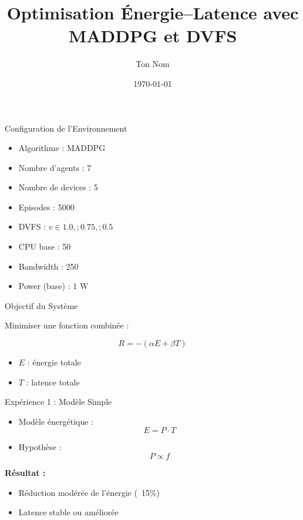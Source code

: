 \documentclass{beamer}
\title{Optimisation Énergie–Latence avec MADDPG et DVFS}
\author{Ton Nom}
\date{\today}
\begin{document}
\begin{frame}
\titlepage
\end{frame}

\begin{frame}{Configuration de l’Environnement}

\begin{itemize}
\item Algorithme : MADDPG
\item Nombre d'agents : 7
\item Nombre de devices : 5
\item Episodes : 5000
\item DVFS : $v \in {1.0,;0.75,;0.5}$
\item CPU base : 50
\item Bandwidth : 250
\item Power (base) : 1 W
\end{itemize}

\end{frame}

\begin{frame}{Objectif du Système}

Minimiser une fonction combinée :

\begin{equation}
R = -(\alpha E + \beta T)
\end{equation}

\begin{itemize}
\item $E$ : énergie totale
\item $T$ : latence totale
\end{itemize}

\end{frame}

\begin{frame}{Expérience 1 : Modèle Simple}

\begin{itemize}
\item Modèle énergétique :
\begin{equation}
E = P \cdot T
\end{equation}

\item Hypothèse :
\begin{equation}
P \propto f
\end{equation}

\end{itemize}

\vspace{0.5cm}

\textbf{Résultat :}
\begin{itemize}
\item Réduction modérée de l'énergie (~15\%)
\item Latence stable ou améliorée
\end{itemize}

\end{frame}
\end{document}
